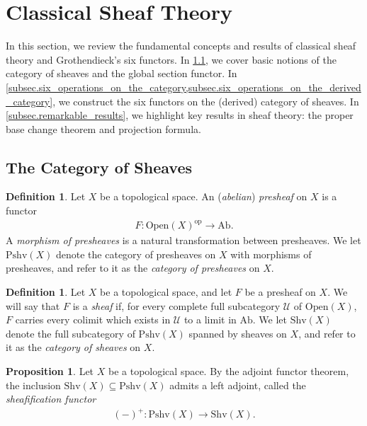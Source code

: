 \documentclass[a4paper,dvipdfmx,11pt,reqno]{amsart}
\DeclareMathOperator{\myop}{op}
\newcommand{\Ab}{\mathrm{Ab}}
\newcommand{\Open}{\mathrm{Open}}
\newcommand{\Pshv}{\mathrm{Pshv}}
\newcommand{\Shv}{\mathrm{Shv}}
\theoremstyle{definition}
\newtheorem{definition}[theorem]{Definition}
\newtheorem{proposition}[theorem]{Proposition}
\begin{document}
\section{Classical Sheaf Theory} \label{sec.classical_sheaf_theory}

In this section, we review the fundamental concepts and results of classical sheaf theory and Grothendieck's six functors. 
In \cref{subsec.the_category_of_sheaves}, we cover basic notions of the category of sheaves and the global section functor. 
In \cref{subsec.six_operations_on_the_category,subsec.six_operations_on_the_derived_category}, we construct the six functors on the (derived) category of sheaves. 
In \cref{subsec.remarkable_results}, we highlight key results in sheaf theory: the proper base change theorem and projection formula. 

\subsection{The Category of Sheaves} \label{subsec.the_category_of_sheaves}

\begin{definition}
  Let $X$ be a topological space.
  An (\textit{abelian}) \textit{presheaf} on $X$ is a functor 
  \begin{align*}
    F : \Open(X)^{\myop} \to \Ab.
  \end{align*}
  A \textit{morphism of presheaves} is a natural transformation between presheaves.
  We let $\Pshv(X)$ denote the category of presheaves on $X$ with morphisms of presheaves, and refer to it as the \textit{category of presheaves} on $X$.
\end{definition}

\begin{definition}
  Let $X$ be a topological space, and let $F$ be a presheaf on $X$.
  We will say that $F$ is a \textit{sheaf} if, for every complete full subcategory $\mathcal{U}$ of $\Open(X)$, $F$ carries every colimit which exists in $\mathcal{U}$ to a limit in $\Ab$.
  We let $\Shv(X)$ denote the full subcategory of $\Pshv(X)$ spanned by sheaves on $X$, and refer to it as the \textit{category of sheaves} on $X$.
\end{definition}

\begin{proposition}
  Let $X$ be a topological space.
  By the adjoint functor theorem, the inclusion $\Shv(X) \subseteq \Pshv(X)$ admits a left adjoint, called the \textit{sheafification functor}
  \begin{align*}
    (-)^{+} : \Pshv(X) \to \Shv(X).
  \end{align*}
\end{proposition}
\end{document}
